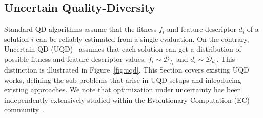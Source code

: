 
\subsection{Uncertain Quality-Diversity} \label{sec:uqd}

Standard QD algorithms assume that the fitness $f_i$ and feature descriptor $d_i$ of a solution $i$ can be reliably estimated from a single evaluation. 
On the contrary, Uncertain QD (UQD)~\cite{flageat2023uncertain} assumes that each solution can get a distribution of possible fitness and feature descriptor values: $f_i \sim \mathcal{D}_{f_i}$ and $d_i \sim \mathcal{D}_{d_i}$. This distinction is illustrated in Figure~\ref{fig:uqd}.
This Section covers existing UQD works, defining the sub-problems that arise in UQD setups and introducing existing approaches. 
We note that optimization under uncertainty has been independently extensively studied within the Evolutionary Computation (EC) community~\cite{ea_uncertain, ea_uncertain_2}.



